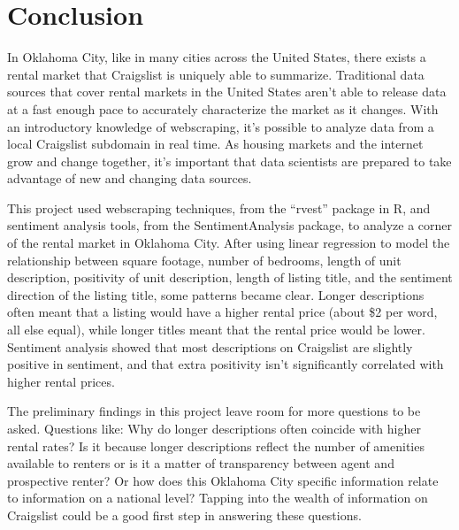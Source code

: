 \documentclass[12pt,english]{article}
\begin{document}
\section{Conclusion}\label{sec:conclusion}

In Oklahoma City, like in many cities across the United States, there exists a rental market that Craigslist is uniquely able to summarize. Traditional data sources that cover rental markets in the United States aren’t able to release data at a fast enough pace to accurately characterize the market as it changes. With an introductory knowledge of webscraping, it’s possible to analyze data from a local Craigslist subdomain in real time. As housing markets and the internet grow and change together, it’s important that data scientists are prepared to take advantage of new and changing data sources. 

This project used webscraping techniques, from the “rvest” package in R, and sentiment analysis tools, from the SentimentAnalysis package, to analyze a corner of the rental market in Oklahoma City. After using linear regression to model the relationship between square footage, number of bedrooms, length of unit description, positivity of unit description, length of listing title,  and the sentiment direction of the listing title, some patterns became clear. Longer descriptions often meant that a listing would have a higher rental price (about \$2 per word, all else equal), while longer titles meant that the rental price would be lower. Sentiment analysis showed that most descriptions on Craigslist are slightly positive in sentiment, and that extra positivity isn’t significantly correlated with higher rental prices. 

The preliminary findings in this project leave room for more questions to be asked. Questions like: Why do longer descriptions often coincide with higher rental rates? Is it because longer descriptions reflect the number of amenities available to renters or is it a matter of transparency between agent and prospective renter? Or how does this Oklahoma City specific information relate to information on a national level? Tapping into the wealth of information on Craigslist could be a good first step in answering these questions.


\vfill
\pagebreak{}
\begin{spacing}{1.0}

\nocite{*}

\end{spacing}
\end{document}
